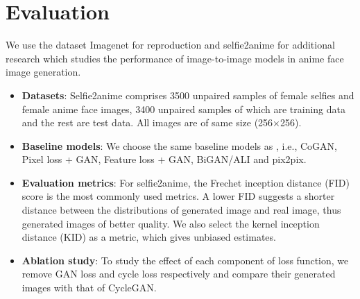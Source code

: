 \section{Evaluation}
We use the dataset Imagenet for reproduction and selfie2anime for additional research which studies the performance of image-to-image models in anime face image generation.

\begin{itemize}
    \item \textbf{Datasets}: 
    Selfie2anime comprises 3500 unpaired samples of female selfies and female anime face images, 3400 unpaired samples of which are training data and the rest are test data. All images are of same size (256×256).
    \item \textbf{Baseline models}: 
    We choose the same baseline models as \cite{zhu_unpaired_2017}, i.e., CoGAN, Pixel loss + GAN, Feature loss + GAN, BiGAN/ALI and pix2pix.
    \item \textbf{Evaluation metrics}: 
    For selfie2anime, the Frechet inception distance (FID) score is the most commonly used metrics. A lower FID suggests a shorter distance between the distributions of generated image and real image, thus generated images of better quality\cite{sym12101705}. We also select the kernel inception distance (KID) as a metric, which gives unbiased estimates.
    \item \textbf{Ablation study}: 
    To study the effect of each component of loss function, we remove GAN loss and cycle loss respectively and compare their generated images with that of CycleGAN.
\end{itemize}




